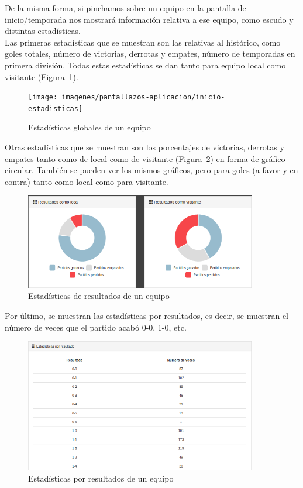 De la misma forma, si pinchamos sobre un equipo en la pantalla de inicio/temporada nos mostrará información relativa a ese equipo, como escudo y distintas estadísticas. \\

Las primeras estadísticas que se muestran son las relativas al histórico, como goles totales, número de victorias, derrotas y empates, número de temporadas en primera división. Todas estas estadísticas se dan tanto para equipo local como visitante (Figura~\ref{fig:equipo-estadisticas}).\\

\begin{figure}[htb]
\centering
\texttt{[image: imagenes/pantallazos-aplicacion/inicio-estadisticas]}
\caption{Estadísticas globales de un equipo}
\label{fig:equipo-estadisticas}
\end{figure} 

Otras estadísticas que se muestran son los porcentajes de victorias, derrotas y empates tanto como de local como de visitante (Figura~\ref{fig:equipo-local}) en forma de gráfico circular. También se pueden ver los mismos gráficos, pero para goles (a favor y en contra) tanto como local como para visitante.\\
 
\begin{figure}[htb]
\centering
\includegraphics[width=0.9\textwidth]{imagenes/pantallazos-aplicacion/equipo-local}
\caption{Estadísticas de resultados de un equipo}
\label{fig:equipo-local}
\end{figure}

Por último, se muestran las estadísticas por resultados, es decir, se muestran el número de veces que el partido acabó 0-0, 1-0, etc. \\

\begin{figure}[htb]
\centering
\includegraphics[width=0.9\textwidth]{imagenes/pantallazos-aplicacion/equipo-resultados}
\caption{Estadísticas por resultados de un equipo}
\label{fig:equipo-resultados}
\end{figure}

